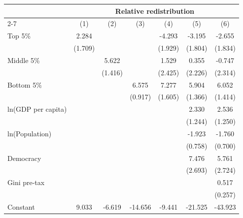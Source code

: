 \begin{tabular}{l*{6}{c}}
\toprule
                    &\multicolumn{6}{c}{Relative redistribution}                                  \\\cmidrule(lr){2-7}
                    &\multicolumn{1}{c}{(1)}&\multicolumn{1}{c}{(2)}&\multicolumn{1}{c}{(3)}&\multicolumn{1}{c}{(4)}&\multicolumn{1}{c}{(5)}&\multicolumn{1}{c}{(6)}\\
\midrule
Top 5\%             &       2.284&            &            &      -4.293&      -3.195&      -2.655\\
                    &     (1.709)&            &            &     (1.929)&     (1.804)&     (1.834)\\
\addlinespace
Middle 5\%          &            &       5.622&            &       1.529&       0.355&      -0.747\\
                    &            &     (1.416)&            &     (2.425)&     (2.226)&     (2.314)\\
\addlinespace
Bottom 5\%          &            &            &       6.575&       7.277&       5.904&       6.052\\
                    &            &            &     (0.917)&     (1.605)&     (1.366)&     (1.414)\\
\addlinespace
ln(GDP per capita)  &            &            &            &            &       2.330&       2.536\\
                    &            &            &            &            &     (1.244)&     (1.250)\\
\addlinespace
ln(Population)      &            &            &            &            &      -1.923&      -1.760\\
                    &            &            &            &            &     (0.758)&     (0.700)\\
\addlinespace
Democracy           &            &            &            &            &       7.476&       5.761\\
                    &            &            &            &            &     (2.693)&     (2.724)\\
\addlinespace
Gini pre-tax        &            &            &            &            &            &       0.517\\
                    &            &            &            &            &            &     (0.257)\\
\addlinespace
Constant            &       9.033&      -6.619&     -14.656&      -9.441&     -21.525&     -43.923\\

\end{tabular}
